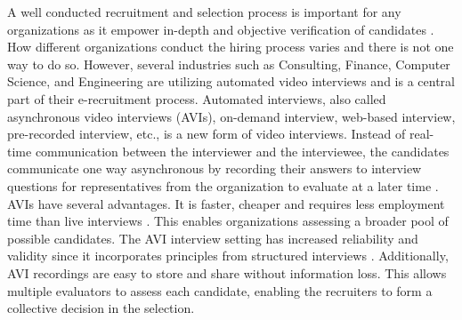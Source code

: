 A well conducted recruitment and selection process is important for any organizations as it empower in-depth and objective verification of candidates \cite{hiring-process-Sołek-BorowskaWilczewska+2018+25+33}. How different organizations conduct the hiring process varies and there is not one way to do so. However, several industries such as Consulting, Finance, Computer Science, and Engineering are utilizing automated video interviews and is a central part of their e-recruitment process. Automated interviews, also called asynchronous video interviews (AVIs), on-demand interview, web-based interview, pre-recorded interview, etc., is a new form of video interviews. Instead of real-time communication between the interviewer and the interviewee, the candidates communicate one way asynchronous by recording their answers to interview questions for representatives from the organization to evaluate at a later time \cite{video-interview1-LUKACIK2022100789}. AVIs have several advantages. It is faster, cheaper and requires less employment time than live interviews \cite{video_interview2-brenner2016asynchronous}. This enables organizations assessing a broader pool of possible candidates. The AVI interview setting has increased reliability and validity since it incorporates principles from structured interviews \cite{video-interview1-LUKACIK2022100789}. Additionally, AVI recordings are easy to store and share without information loss. This allows multiple evaluators to assess each candidate, enabling the recruiters to form a collective decision in the selection.   \\


